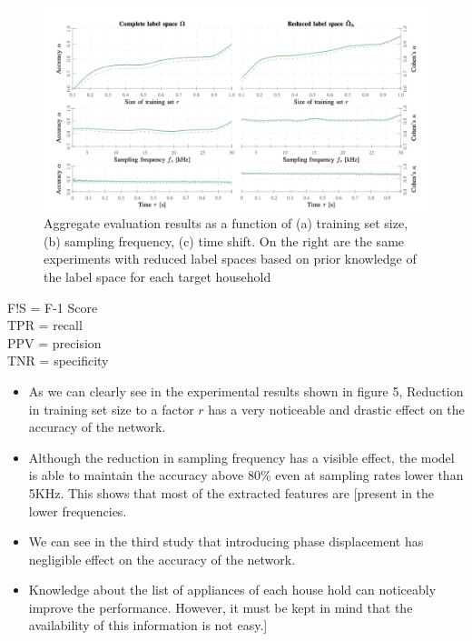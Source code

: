 \documentclass[11pt, a4paper]{article} %
\begin{document}
\begin{figure}[htpb!] %
    \centering %
    \includegraphics[scale=0.8]{figure/results2.png} %
    \caption{Aggregate evaluation results as a function of (a) training set size, (b) sampling frequency, (c) time shift. On the right are the same experiments with reduced label spaces based on prior knowledge of the label space for each target household\cite{barsim2018neural}} %
    \label{fig:my_label} %
\end{figure}

\begin{center}
    F!S = F-1 Score \\
    TPR = recall \\
    PPV = precision \\
    TNR = specificity \\
\end{center}
\begin{itemize}
    \item As we can clearly see in the experimental results shown in figure 5, Reduction in training set size to a factor $r$ has a very noticeable and drastic effect on the accuracy of the network.
    \item Although the reduction in sampling frequency has a visible effect, the model is able to maintain the accuracy above 80\% even at sampling rates lower than 5KHz. This shows that most of the extracted features are [present in the lower frequencies.
    \item We can see in the third study that introducing phase displacement has negligible effect on the accuracy of the network.
    \item Knowledge about the list of appliances of each house hold can noticeably improve the performance. However, it must be kept in mind that the availability of this information is not easy.]
\end{itemize}
\end{document}
